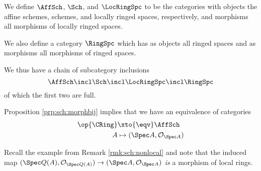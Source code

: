\documentclass[wip, algebra]{bsteffan-lecturenotes}
\newcommand{\cO}{\mathcal{O}}
\begin{document}
\begin{definition}
	We define $\AffSch$, $\Sch$, and $\LocRingSpc$ to be the categories with objects the affine schemes, schemes, and locally ringed spaces, respectively, and morphisms all morphisms of locally ringed spaces.

	We also define a category $\RingSpc$ which has as objects all ringed spaces and as morphisms all morphisms of ringed spaces.
\end{definition}
We thus have a chain of subcategory inclusions
\begin{equation*}
	\AffSch \incl \Sch \incl \LocRingSpc \incl \RingSpc
\end{equation*}
of which the first two are full.
\begin{remark}\label{prp:sch:ringaff}
	Proposition \ref{prp:sch:morphbij} implies that we have an equivalence of categories 
	\begin{align*}
		\op{\CRing} &\xto{\eqv} \AffSch \\
		A &\mapsto (\Spec A, \cO_{\Spec A})
	\end{align*}
\end{remark}
\begin{remark}
	Recall the example from Remark \ref{rmk:sch:nonlocal} and note that the induced map $(\Spec Q(A), \cO_{\Spec Q(A)}) \to (\Spec A, \cO_{\Spec A})$ \emph{is} a morphism of local rings.
\end{remark}
\end{document}
